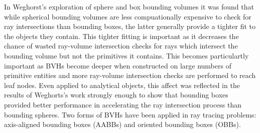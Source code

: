 \documentclass[12pt, a4paper]{article}
\begin{document}
In Weghorst's exploration of sphere and box bounding volumes it was found that while spherical bounding volumes are less compuationally expensive to check for ray intersections than bounding boxes, the latter generally provide a tighter fit to the objects they contain. This tighter fitting is important as it decreases the chance of wasted ray-volume intersection checks for rays which intersect the bounding volume but not the primitives it contains. This becomes particulartly important as BVHs become deeper when constructed on large numbers of primitive entities and more ray-volume intersection checks are performed to reach leaf nodes. Even applied to analytical objects, this affect was reflected in the results of Weghorts's work strongly enough to show that bounding boxes provided better performance in accelerating the ray intersection process than bounding spheres. Two forms of BVHs have been applied in ray tracing problems: axis-aligned bounding boxes (AABBs) and oriented bounding boxes (OBBs).
\end{document}

